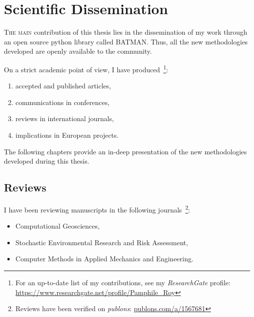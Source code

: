 \chapter{Scientific Dissemination}

\lettrine{T}{he main} contribution of this thesis lies in the dissemination of my work through an open source python library called BATMAN. Thus, all the new methodologies developed are openly available to the community.

On a strict academic point of view, I have produced~\footnote{For an up-to-date list of my contributions, see my \emph{ResearchGate} profile: \href{https://www.researchgate.net/profile/Pamphile\_Roy}{https://www.researchgate.net/profile/Pamphile\_Roy}}:

\begin{enumerate}
\item[\textbf{7}] accepted and published articles,
\item[\textbf{6}] communications in conferences,
\item[\textbf{3}] reviews in international journals,
\item[\textbf{2}] implications in European projects.
\end{enumerate}

The following chapters provide an in-deep presentation of the new methodologies developed during this thesis.

{}

{}

\section*{Reviews}

I have been reviewing manuscripts in the following journals~\footnote{Reviews have been verified on \emph{publons}: \href{https://publons.com/a/1567681}{publons.com/a/1567681}}:

\begin{itemize}
\item Computational Geosciences,
\item Stochastic Environmental Research and Risk Assessment,
\item Computer Methods in Applied Mechanics and Engineering.
\end{itemize}

